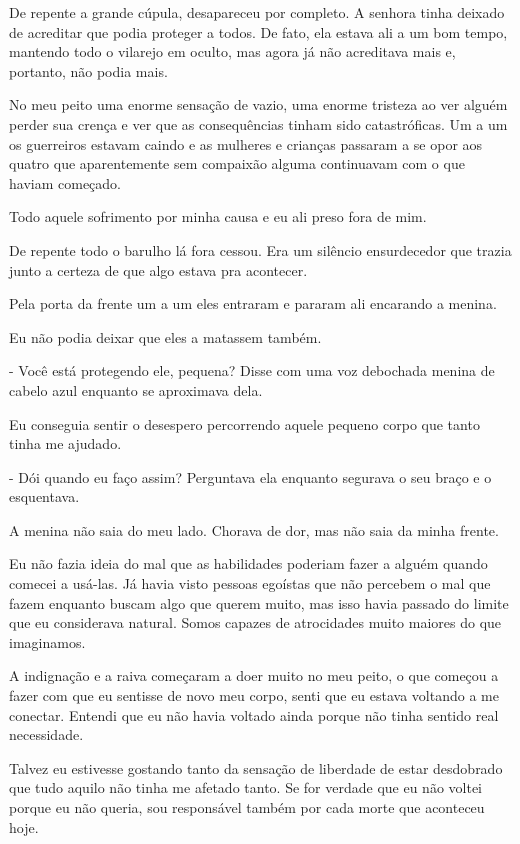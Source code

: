 De repente a grande cúpula, desapareceu por completo. A senhora tinha deixado de acreditar que podia proteger a todos. De fato, ela estava ali a um bom tempo, mantendo todo o vilarejo em oculto, mas agora já não acreditava mais e, portanto, não podia mais.

No meu peito uma enorme sensação de vazio, uma enorme tristeza ao ver alguém perder sua crença e ver que as consequências tinham sido catastróficas. Um a um os guerreiros estavam caindo e as mulheres e crianças passaram a se opor aos quatro que aparentemente sem compaixão alguma continuavam com o que haviam começado.

Todo aquele sofrimento por minha causa e eu ali preso fora de mim.

De repente todo o barulho lá fora cessou. Era um silêncio ensurdecedor que trazia junto a certeza de que algo estava pra acontecer.

Pela porta da frente um a um eles entraram e pararam ali encarando a menina.

Eu não podia deixar que eles a matassem também.

- Você está protegendo ele, pequena? Disse com uma voz debochada menina de cabelo azul enquanto se aproximava dela.

Eu conseguia sentir o desespero percorrendo aquele pequeno corpo que tanto tinha me ajudado.

- Dói quando eu faço assim? Perguntava ela enquanto segurava o seu braço e o esquentava.

A menina não saia do meu lado. Chorava de dor, mas não saia da minha frente.

Eu não fazia ideia do mal que as habilidades poderiam fazer a alguém quando comecei a usá-las. Já havia visto pessoas egoístas que não percebem o mal que fazem enquanto buscam algo que querem muito, mas isso havia passado do limite que eu considerava natural. Somos capazes de atrocidades muito maiores do que imaginamos.

A indignação e a raiva começaram a doer muito no meu peito, o que começou a fazer com que eu sentisse de novo meu corpo, senti que eu estava voltando a me conectar. Entendi que eu não havia voltado ainda porque não tinha sentido real necessidade. 

Talvez eu estivesse gostando tanto da sensação de liberdade de estar desdobrado que tudo aquilo não tinha me afetado tanto. Se for verdade que eu não voltei porque eu não queria, sou responsável também por cada morte que aconteceu hoje.

